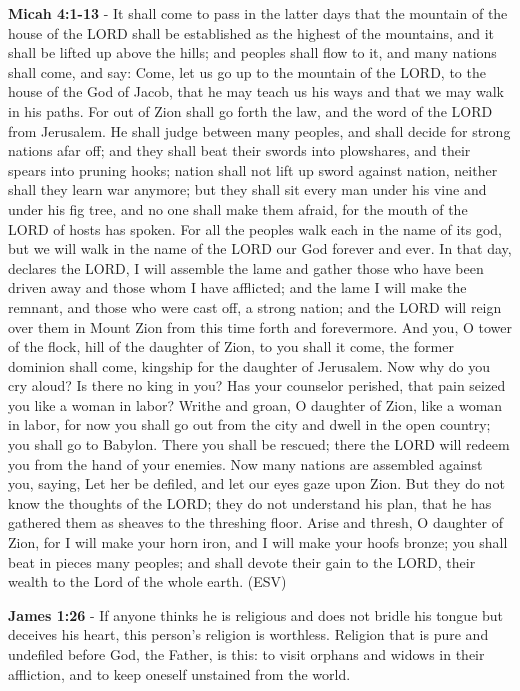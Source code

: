 \documentclass[11pt]{article}
\begin{document}
\textbf{Micah 4:1-13} - It shall come to pass in the latter days that the mountain of the house of the LORD shall be established as the highest of the mountains, and it shall be lifted up above the hills; and peoples shall flow to it, and many nations shall come, and say: Come, let us go up to the mountain of the LORD, to the house of the God of Jacob, that he may teach us his ways and that we may walk in his paths. For out of Zion shall go forth the law, and the word of the LORD from Jerusalem. He shall judge between many peoples, and shall decide for strong nations afar off; and they shall beat their swords into plowshares, and their spears into pruning hooks; nation shall not lift up sword against nation, neither shall they learn war anymore; but they shall sit every man under his vine and under his fig tree, and no one shall make them afraid, for the mouth of the LORD of hosts has spoken. For all the peoples walk each in the name of its god, but we will walk in the name of the LORD our God forever and ever. In that day, declares the LORD, I will assemble the lame and gather those who have been driven away and those whom I have afflicted; and the lame I will make the remnant, and those who were cast off, a strong nation; and the LORD will reign over them in Mount Zion from this time forth and forevermore. And you, O tower of the flock, hill of the daughter of Zion, to you shall it come, the former dominion shall come, kingship for the daughter of Jerusalem. Now why do you cry aloud? Is there no king in you? Has your counselor perished, that pain seized you like a woman in labor? Writhe and groan, O daughter of Zion, like a woman in labor, for now you shall go out from the city and dwell in the open country; you shall go to Babylon. There you shall be rescued; there the LORD will redeem you from the hand of your enemies. Now many nations are assembled against you, saying, Let her be defiled, and let our eyes gaze upon Zion. But they do not know the thoughts of the LORD; they do not understand his plan, that he has gathered them as sheaves to the threshing floor. Arise and thresh, O daughter of Zion, for I will make your horn iron, and I will make your hoofs bronze; you shall beat in pieces many peoples; and shall devote their gain to the LORD, their wealth to the Lord of the whole earth. (ESV)

\textbf{James 1:26} - If anyone thinks he is religious and does not bridle his tongue but deceives his heart, this person's religion is worthless. Religion that is pure and undefiled before God, the Father, is this: to visit orphans and widows in their affliction, and to keep oneself unstained from the world.
\end{document}
